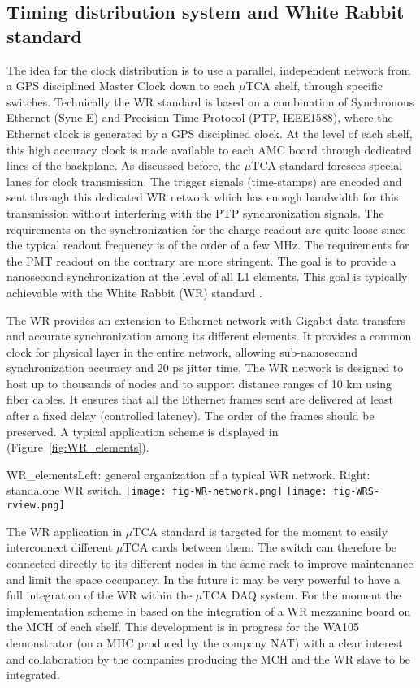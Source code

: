 \subsection{Timing distribution system and White Rabbit standard}

The idea for the clock distribution is to use a parallel, independent network from a GPS disciplined Master Clock down to each $\mu$TCA shelf, through specific switches. Technically the WR standard is based on a combination of   Synchronous Ethernet (Sync-E) and Precision Time Protocol (PTP, IEEE1588), where the Ethernet clock is generated by a GPS disciplined clock. At the level of each shelf, this high accuracy clock is made available to each AMC board through dedicated lines of the backplane. As discussed before, the $\mu$TCA standard foresees special lanes for clock transmission. The trigger signals (time-stamps) are encoded and sent through this dedicated WR network which has enough bandwidth for this transmission without interfering with the PTP synchronization signals. The requirements on the synchronization for the charge readout are quite loose since the typical readout frequency is of the order of a few MHz. The requirements for the PMT readout on the contrary are more stringent. The goal is to provide a nanosecond synchronization at the level of all L1 elements. This goal is typically achievable with the White Rabbit (WR) standard \cite{WR-standard}.

The WR provides an extension to Ethernet network with Gigabit data transfers and accurate synchronization among its different elements. It provides a common clock for physical layer in the entire network, allowing sub-nanosecond synchronization accuracy and 20 ps jitter time. The WR network is designed to host up to thousands of nodes and to support distance ranges of 10 km using fiber cables. It ensures that all the Ethernet frames sent are delivered at least after a fixed delay (controlled latency). The order of the frames should be preserved.  A typical application scheme is displayed in  (Figure~\ref{fig:WR_elements}).

\begin{cdrfigure}{WR_elements}{\small Left: general organization of a typical WR network. Right: standalone WR switch.}
\texttt{[image: fig-WR-network.png]}
\texttt{[image: fig-WRS-rview.png]}
\end{cdrfigure}

The WR application in $\mu$TCA standard is targeted for the moment to easily interconnect different $\mu$TCA cards between them. The switch can therefore be connected directly to its different nodes in the same rack to improve maintenance and limit the space occupancy. In the future it may be very powerful to have a  full integration of the WR within the $\mu$TCA DAQ system. For the moment the implementation scheme in based on the integration of a WR mezzanine board on the MCH of each shelf. This development is in progress for the WA105 demonstrator  (on a MHC  produced by the company NAT) with a clear interest and collaboration by the companies producing the MCH and the WR slave to be integrated.   
 